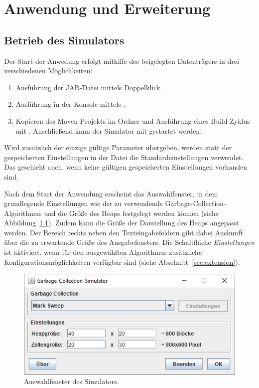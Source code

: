 \chapter{Anwendung und Erweiterung}
\label{cha:application}

\section{Betrieb des Simulators}
\label{sec:execution}
Der Start der Anwedung erfolgt mithilfe des beigelegten Datenträgers in drei verschiedenen Möglichkeiten:
\begin{enumerate}
	\item Ausführung der JAR-Datei  mittels Doppelklick.
	\item Ausführung in der Konsole mittels .
	\item Kopieren des Maven-Projekts im Ordner  und Ausführung eines Build-Zyklus mit .
	Anschließend kann der Simulator mit  gestartet werden.
\end{enumerate}

Wird zusätzlich der einzige gültige Parameter  übergeben, werden statt der gespeicherten Einstellungen in der Datei  die Standardeinstellungen verwendet.
Das geschieht auch, wenn keine gültigen gespeicherten Einstellungen vorhanden sind.

Nach dem Start der Anwendung erscheint das Auswahlfenster, in dem grundlegende Einstellungen wie der zu verwendende Garbage-Collection-Algorithmus und die Größe des Heaps festgelegt werden können (siehe Abbildung~\ref{fig:app-start}).
Zudem kann die Größe der Darstellung des Heaps angepasst werden.
Der Bereich rechts neben den Texteingabefeldern gibt dabei Auskunft über die zu erwartende Größe des Ausgabefensters.
Die Schaltfläche \textit{Einstellungen} ist aktiviert, wenn für den ausgewählten Algorithmus zusätzliche Konfigurationsmöglichkeiten verfügbar sind (siehe Abschnitt~\ref{sec:extension}).

\begin{figure}[h]
	\centering
	\includegraphics[scale=0.5]{img/gui/selection.png}
	\caption[Auswahlfenster des Simulators]{Auswahlfenster des Simulators.}
	\label{fig:app-start}
\end{figure}

